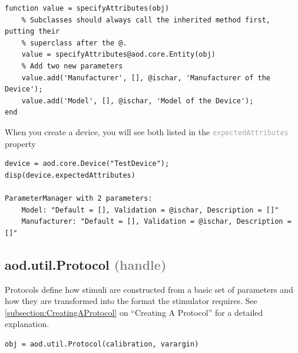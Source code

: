 \documentclass[10pt]{exam}
\newcommand\myurl[1]{\textcolor{blue}{\underline{#1}}}
\newcommand\myparent[1]{\textcolor{gray}{(#1)}}
\newcommand\aodprop[1]{\textcolor{darkgray}{\texttt{#1}}}
\begin{document}
		\begin{lstlisting}[style=matlab-editor, basicstyle=\mlttfamily\footnotesize]
function value = specifyAttributes(obj)
	% Subclasses should always call the inherited method first, putting their 
	% superclass after the @. 
	value = specifyAttributes@aod.core.Entity(obj)
	% Add two new parameters 
	value.add('Manufacturer', [], @ischar, 'Manufacturer of the Device');
	value.add('Model', [], @ischar, 'Model of the Device');
end
		\end{lstlisting}
		When you create a device, you will see both listed in the \aodprop{expectedAttributes} property
		\begin{lstlisting}[style=matlab-editor, basicstyle=\mlttfamily\footnotesize]
device = aod.core.Device("TestDevice");
disp(device.expectedAttributes)

ParameterManager with 2 parameters:
	Model: "Default = [], Validation = @ischar, Description = []"
	Manufacturer: "Default = [], Validation = @ischar, Description = []"
		\end{lstlisting}


	\subsection{aod.util.Protocol \myparent{handle}}
		\label{subsection:ProtocolDoc}
		\noindent Protocols define how stimuli are constructed from a basic set of parameters and how they are transformed into the format the stimulator requires. See \myurl{\ref{subsection:CreatingAProtocol}} on ``Creating A Protocol'' for a detailed explanation. 
		\begin{lstlisting}[style=matlab-editor, basicstyle=\mlttfamily\footnotesize]
obj = aod.util.Protocol(calibration, varargin)
		\end{lstlisting}
	
\end{document}
